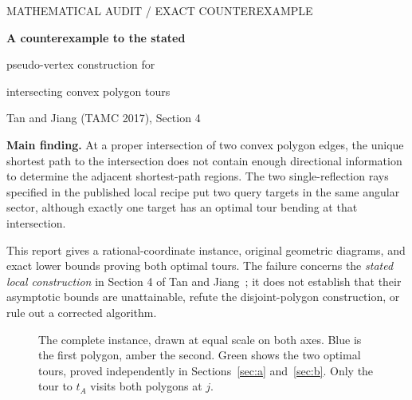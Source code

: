 \documentclass[11pt,a4paper]{article}
\begin{document}
\thispagestyle{fancy}
{\sffamily\small\color{good}MATHEMATICAL AUDIT \quad / \quad EXACT COUNTEREXAMPLE}\par
\vspace{3mm}
{\LARGE\bfseries A counterexample to the stated\par
pseudo-vertex construction for\par
intersecting convex polygon tours\par}
\vspace{2mm}
{\large Tan and Jiang (TAMC 2017), Section 4}\par
\vspace{2mm}

\begin{resultbox}
\textbf{Main finding.} At a proper intersection of two convex polygon edges,
the unique shortest path to the intersection does not contain enough directional
information to determine the adjacent shortest-path regions. The two
single-reflection rays specified in the published local recipe put two query
targets in the same angular sector, although exactly one target has an optimal
tour bending at that intersection.
\end{resultbox}

This report gives a rational-coordinate instance, original geometric diagrams,
and exact lower bounds proving both optimal tours. The failure concerns the
\emph{stated local construction} in Section 4 of Tan and Jiang~\cite{tan}; it
does not establish that their asymptotic bounds are unattainable, refute the
disjoint-polygon construction, or rule out a corrected algorithm.

\begin{figure}[h!]
\centering
{}
\caption{The complete instance, drawn at equal scale on both axes. Blue is the
first polygon, amber the second. Green shows the two optimal tours, proved
independently in Sections~\ref{sec:a} and~\ref{sec:b}. Only the tour to $t_A$
visits both polygons at $j$.}
\label{fig:overview}
\end{figure}
\end{document}
